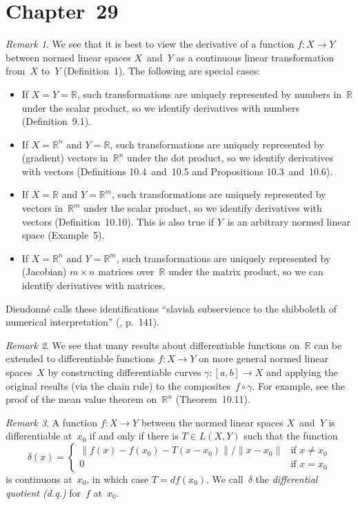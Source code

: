 \documentclass[letterpaper,12pt]{article}
\newcommand{\R}{\mathbb{R}}
\newcommand{\after}{\circ}
\newcommand{\df}{d\!f}
\newcommand{\norm}[1]{\lVert{#1}\rVert}
\theoremstyle{plain}
\theoremstyle{definition}
\theoremstyle{remark}
\newtheorem*{rmk}{Remark}
\begin{document}
\section*{Chapter~29}
\begin{rmk}
We see that it is best to view the derivative of a function \(f:X\to Y\) between normed linear spaces \(X\)~and~\(Y\) as a continuous linear transformation from~\(X\) to~\(Y\) (Definition~1). The following are special cases:
\begin{itemize}
\item If \(X=Y=\R\), such transformations are uniquely represented by numbers in~\(\R\) under the scalar product, so we identify derivatives with numbers (Definition~9.1).
\item If \(X=\R^n\) and \(Y=\R\), such transformations are uniquely represented by (gradient) vectors in~\(\R^n\) under the dot product, so we identify derivatives with vectors (Definitions 10.4~and~10.5 and Propositions 10.3~and~10.6).
\item If \(X=\R\) and \(Y=\R^m\), such transformations are uniquely represented by vectors in~\(\R^m\) under the scalar product, so we identify derivatives with vectors (Definition~10.10). This is also true if \(Y\)~is an arbitrary normed linear space (Example~5).
\item If \(X=\R^n\) and \(Y=\R^m\), such transformations are uniquely represented by (Jacobian) \(m\times n\) matrices over~\(\R\) under the matrix product, so we can identify derivatives with matrices.
\end{itemize}
Dieudonn\'e calls these identifications ``slavish subservience to the shibboleth of numerical interpretation'' (\cite{dieudonne}, p.~141).
\end{rmk}

\begin{rmk}
We see that many results about differentiable functions on~\(\R\) can be extended to differentiable functions \(f:X\to Y\) on more general normed linear spaces~\(X\) by constructing differentiable curves \(\gamma:[a,b]\to X\) and applying the original results (via the chain rule) to the composites~\(f\after\gamma\). For example, see the proof of the mean value theorem on~\(\R^n\) (Theorem~10.11).
\end{rmk}

\begin{rmk}
A function \(f:X\to Y\) between the normed linear spaces \(X\)~and~\(Y\) is differentiable at~\(x_0\) if and only if there is \(T\in L(X,Y)\) such that the function
\[\delta(x)=\begin{cases}
\norm{f(x)-f(x_0)-T(x-x_0)}/\norm{x-x_0}&\text{if }x\ne x_0\\
0&\text{if }x=x_0
\end{cases}\]
is continuous at~\(x_0\), in which case \(T=\df(x_0)\). We call~\(\delta\) the \emph{differential quotient (d.q.)} for~\(f\) at~\(x_0\).
\end{rmk}
\end{document}
